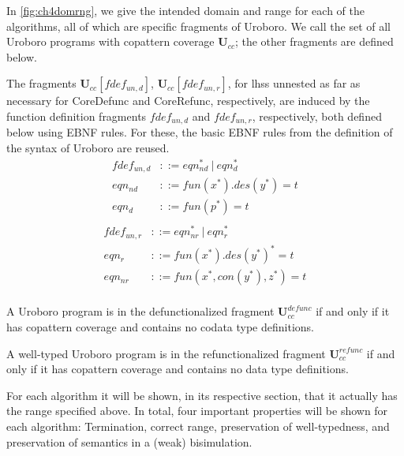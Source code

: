 In \autoref{fig:ch4domrng}, we give the intended domain and range for each of the algorithms, all of which are specific fragments of Uroboro. We call the set of all Uroboro programs with copattern coverage $\mathbf{U}_{cc}$; the other fragments are defined below.

\begin{definition}
The fragments $\mathbf{U}_{cc}[fdef_{un,d}]$, $\mathbf{U}_{cc}[fdef_{un,r}]$, for lhss unnested as far as necessary for \textsf{CoreDefunc} and \textsf{CoreRefunc}, respectively, are induced by the function definition fragments $fdef_{un,d}$ and $fdef_{un,r}$, respectively, both defined below using EBNF rules. For these, the basic EBNF rules from the definition of the syntax of Uroboro are reused.
\begin{align*}
fdef_{un,d} &::= eqn_{nd}^* ~ | ~ eqn_d^* \\
eqn_{nd} &::= fun(x^*).des(y^*) = t \\
eqn_d &::= fun(p^*) = t \\
\end{align*}
\begin{align*}
fdef_{un,r} &::= eqn_{nr}^* ~ | ~ eqn_r^* \\
eqn_r &::= fun(x^*).des(y^*)^* = t \\
eqn_{nr} &::= fun(x^*, con(y^*), z^*) = t \\
\end{align*}
\end{definition}

\begin{definition}
A Uroboro program is in the defunctionalized fragment $\mathbf{U}^{defunc}_{cc}$ if and only if it has copattern coverage and contains no codata type definitions.
\end{definition}

\begin{definition}
A well-typed Uroboro program is in the refunctionalized fragment $\mathbf{U}^{refunc}_{cc}$ if and only if it has copattern coverage and contains no data type definitions.
\end{definition}

For each algorithm it will be shown, in its respective section, that it actually has the range specified above. In total, four important properties will be shown for each algorithm: Termination, correct range, preservation of well-typedness, and preservation of semantics in a (weak) bisimulation.


